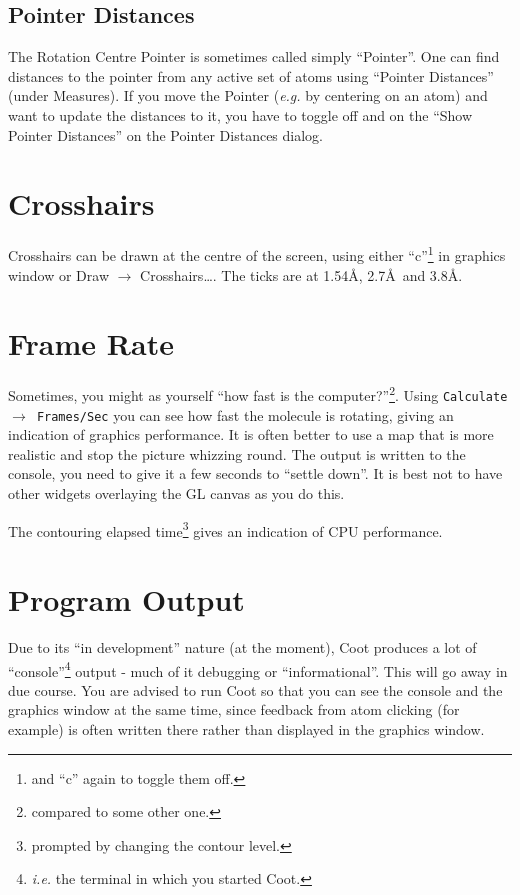 \documentclass{book}
\begin{document}
\subsection{Pointer Distances}
The Rotation Centre Pointer is sometimes called simply ``Pointer''.
One can find distances to the pointer from any active set of atoms
using ``Pointer Distances'' (under Measures).  If you move the Pointer
(\emph{e.g.} by centering on an atom) and want to update the distances
to it, you have to toggle off and on the ``Show Pointer Distances'' on
the Pointer Distances dialog.

\section{Crosshairs}
Crosshairs can be drawn at the centre of the screen,
using either ``c''\footnote{and ``c'' again to toggle them off.} in
graphics window or \textsf{Draw $\rightarrow$ Crosshairs\ldots}.  The
ticks are at 1.54\AA, 2.7\AA\ and 3.8\AA.

\section{Frame Rate}
Sometimes, you might as yourself ``how fast is the
computer?''\footnote{compared to some other one.}.  Using
\texttt{Calculate $\rightarrow$ Frames/Sec} you can see how fast the
molecule is rotating, giving an indication of graphics performance.
It is often better to use a map that is more realistic and stop the
picture whizzing round.  The output is written to the console, you need
to give it a few seconds to ``settle down''.  It is best not to have
other widgets overlaying the GL canvas as you do this.

The contouring elapsed time\footnote{prompted by changing the contour
  level.} gives an indication of CPU performance.

\section{Program Output}
 Due to its ``in development'' nature (at the moment),
Coot produces a lot of ``console''\footnote{\emph{i.e.} the terminal
  in which you started Coot.} output - much of it debugging or
``informational''.  This will go away in due course.  You are advised
to run Coot so that you can see the console and the graphics window at
the same time, since feedback from atom clicking (for example) is
often written there rather than displayed in the graphics window.
\end{document}
